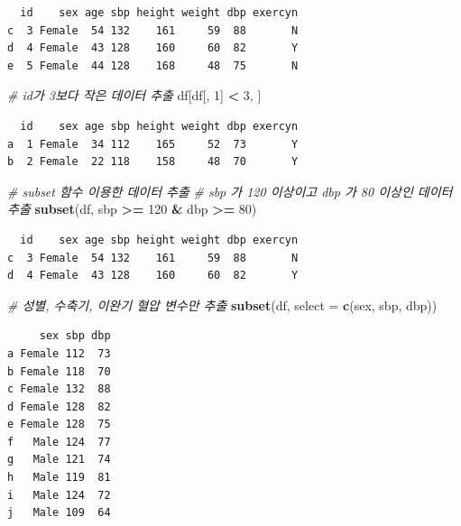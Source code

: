 \documentclass[
  11pt,
]{krantz}
\newenvironment{Shaded}{\begin{snugshade}}{\end{snugshade}}
\newcommand{\CommentTok}[1]{\textcolor[rgb]{0.37,0.37,0.37}{\textit{#1}}}
\newcommand{\DataTypeTok}[1]{\textcolor[rgb]{0.27,0.27,0.27}{#1}}
\newcommand{\DecValTok}[1]{\textcolor[rgb]{0.06,0.06,0.06}{#1}}
\newcommand{\KeywordTok}[1]{\textcolor[rgb]{0.27,0.27,0.27}{\textbf{#1}}}
\newcommand{\NormalTok}[1]{#1}
\newcommand{\OperatorTok}[1]{\textcolor[rgb]{0.43,0.43,0.43}{\textbf{#1}}}
\newcommand{\StringTok}[1]{\textcolor[rgb]{0.5,0.5,0.5}{#1}}
\begin{document}
\begin{verbatim}
  id    sex age sbp height weight dbp exercyn
c  3 Female  54 132    161     59  88       N
d  4 Female  43 128    160     60  82       Y
e  5 Female  44 128    168     48  75       N
\end{verbatim}

\begin{Shaded}
\begin{Highlighting}[]
\CommentTok{# id가 3보다 작은 데이터 추출}
\NormalTok{df[df[, }\DecValTok{1}\NormalTok{] }\OperatorTok{<}\StringTok{ }\DecValTok{3}\NormalTok{, ]}
\end{Highlighting}
\end{Shaded}

\begin{verbatim}
  id    sex age sbp height weight dbp exercyn
a  1 Female  34 112    165     52  73       Y
b  2 Female  22 118    158     48  70       Y
\end{verbatim}

\begin{Shaded}
\begin{Highlighting}[]
\CommentTok{# subset 함수 이용한 데이터 추출}
\CommentTok{# sbp 가 120 이상이고 dbp 가 80 이상인 데이터 추출}
\KeywordTok{subset}\NormalTok{(df, sbp }\OperatorTok{>=}\StringTok{ }\DecValTok{120} \OperatorTok{&}\StringTok{ }\NormalTok{dbp }\OperatorTok{>=}\StringTok{ }\DecValTok{80}\NormalTok{)}
\end{Highlighting}
\end{Shaded}

\begin{verbatim}
  id    sex age sbp height weight dbp exercyn
c  3 Female  54 132    161     59  88       N
d  4 Female  43 128    160     60  82       Y
\end{verbatim}

\begin{Shaded}
\begin{Highlighting}[]
\CommentTok{# 성별, 수축기, 이완기 혈압 변수만 추출}
\KeywordTok{subset}\NormalTok{(df, }\DataTypeTok{select =} \KeywordTok{c}\NormalTok{(sex, sbp, dbp))}
\end{Highlighting}
\end{Shaded}

\begin{verbatim}
     sex sbp dbp
a Female 112  73
b Female 118  70
c Female 132  88
d Female 128  82
e Female 128  75
f   Male 124  77
g   Male 121  74
h   Male 119  81
i   Male 124  72
j   Male 109  64
\end{verbatim}
\end{document}
